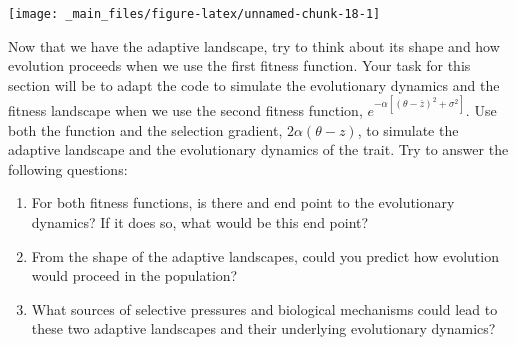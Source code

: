 \documentclass[
]{book}
\begin{document}
\texttt{[image: \_main\_files/figure-latex/unnamed-chunk-18-1]}

Now that we have the adaptive landscape, try to think about its shape and how evolution proceeds when we use the first fitness function. Your task for this section will be to adapt the code to simulate the evolutionary dynamics and the fitness landscape when we use the second fitness function, \(e^{-\alpha\left[\left(\theta-\overline{z}\right)^2 + \sigma^2\right]}\). Use both the function and the selection gradient, \(2\alpha (\theta-z)\), to simulate the adaptive landscape and the evolutionary dynamics of the trait. Try to answer the following questions:

\begin{enumerate}
\def\labelenumi{\arabic{enumi}.}
\item
  For both fitness functions, is there and end point to the evolutionary dynamics? If it does so, what would be this end point?
\item
  From the shape of the adaptive landscapes, could you predict how evolution would proceed in the population?
\item
  What sources of selective pressures and biological mechanisms could lead to these two adaptive landscapes and their underlying evolutionary dynamics?
\end{enumerate}

  
\end{document}
